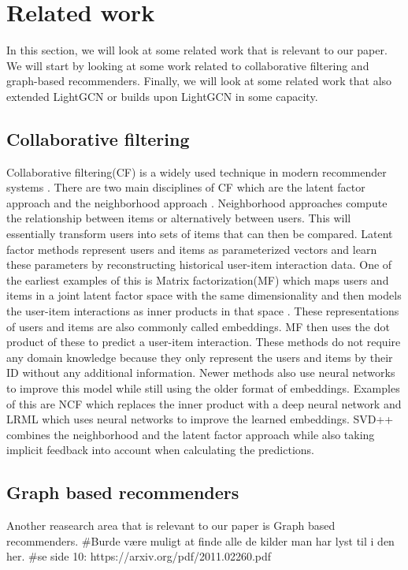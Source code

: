 \section{Related work} 
In this section, we will look at some related work that is relevant to our paper.
We will start by looking at some work related to collaborative filtering and graph-based recommenders.
Finally, we will look at some related work that also extended LightGCN or builds upon LightGCN in some capacity.

\subsection{Collaborative filtering}
Collaborative filtering(CF) is a widely used technique in modern recommender systems \cite{lightgcn}.
There are two main disciplines of CF which are the latent factor approach and the neighborhood approach \cite{SVD}.
Neighborhood approaches compute the relationship between items or alternatively between users.
This will essentially transform users into sets of items that can then be compared.
Latent factor methods represent users and items as parameterized vectors and learn these parameters by reconstructing historical user-item interaction data.
One of the earliest examples of this is Matrix factorization(MF) which maps users and items in a joint latent factor space with the same dimensionality and then models the user-item interactions as inner products in that space \cite{Matrix-factorization-techniques}.
These representations of users and items are also commonly called embeddings.
MF then uses the dot product of these to predict a user-item interaction.
These methods do not require any domain knowledge because they only represent the users and items by their ID without any additional information.
Newer methods also use neural networks to improve this model while still using the older format of embeddings. 
Examples of this are NCF \cite{NCF} which replaces the inner product with a deep neural network and LRML\cite{LRML} which uses neural networks to improve the learned embeddings.
SVD++ \cite{SVD} combines the neighborhood and the latent factor approach while also taking implicit feedback into account when calculating the predictions.

\subsection{Graph based recommenders}
Another reasearch area that is relevant to our paper is Graph based recommenders.
#Burde være muligt at finde alle de kilder man har lyst til i den her. 
#se side 10: https://arxiv.org/pdf/2011.02260.pdf

